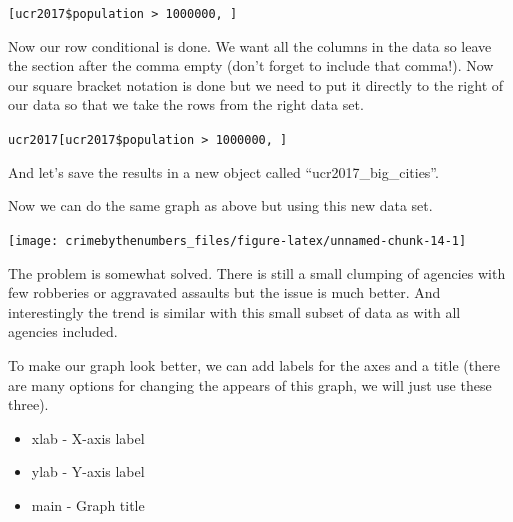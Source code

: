 \documentclass[
  12pt,
]{book}
\newenvironment{Shaded}{\begin{snugshade}}{\end{snugshade}}
\newcommand{\DecValTok}[1]{\textcolor[rgb]{0.06,0.06,0.06}{#1}}
\newcommand{\KeywordTok}[1]{\textcolor[rgb]{0.27,0.27,0.27}{\textbf{#1}}}
\newcommand{\NormalTok}[1]{#1}
\newcommand{\OperatorTok}[1]{\textcolor[rgb]{0.43,0.43,0.43}{\textbf{#1}}}
\newcommand{\StringTok}[1]{\textcolor[rgb]{0.5,0.5,0.5}{#1}}
\providecommand{\tightlist}{%
  \setlength{\itemsep}{0pt}\setlength{\parskip}{0pt}}
\begin{document}
\texttt{{[}ucr2017\$population\ \textgreater{}\ 1000000,\ {]}}

Now our row conditional is done. We want all the columns in the data so leave the section after the comma empty (don't forget to include that comma!). Now our square bracket notation is done but we need to put it directly to the right of our data so that we take the rows from the right data set.

\texttt{ucr2017{[}ucr2017\$population\ \textgreater{}\ 1000000,\ {]}}

And let's save the results in a new object called ``ucr2017\_big\_cities''.

\begin{Shaded}
\end{Shaded}

Now we can do the same graph as above but using this new data set.

\begin{Shaded}
\end{Shaded}

\begin{center}\texttt{[image: crimebythenumbers\_files/figure-latex/unnamed-chunk-14-1]} \end{center}

The problem is somewhat solved. There is still a small clumping of agencies with few robberies or aggravated assaults but the issue is much better. And interestingly the trend is similar with this small subset of data as with all agencies included.

To make our graph look better, we can add labels for the axes and a title (there are many options for changing the appears of this graph, we will just use these three).

\begin{itemize}
\tightlist
\item
  xlab - X-axis label
\item
  ylab - Y-axis label
\item
  main - Graph title
\end{itemize}
\end{document}
